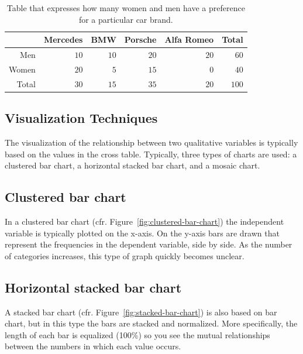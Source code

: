 \begin{table} \centering
  \begin{tabular}{@{}rrrrrr@{}}
  	\toprule
  	        & Mercedes &  BMW & Porsche & Alfa Romeo & Total  \\
  	\midrule
  	    Men &     $10$ & $10$ &    $20$ &       $20$ &   $60$ \\
  	  Women &     $20$ &  $5$ &    $15$ &        $0$ &   $40$ \\
  	  Total &     $30$ & $15$ &    $35$ &       $20$ &  $100$ \\
  	\bottomrule
  \end{tabular}
  \caption{Table that expresses how many women and men have a preference for a particular car brand.}
  \label{tab:car-preference}
\end{table}

\subsection{Visualization Techniques}
\label{ssec:qual-qual-visualization}

The visualization of the relationship between two qualitative variables is typically based on the values in the cross table. Typically, three types of charts are used: a clustered bar chart, a horizontal stacked bar chart, and a mosaic chart.

\subsection{Clustered bar chart}

In a clustered bar chart (cfr. Figure~\ref{fig:clustered-bar-chart}) the independent variable is typically plotted on the x-axis. On the y-axis bars are drawn that represent the frequencies in the dependent variable, side by side. As the number of categories increases, this type of graph quickly becomes unclear.

\subsection{Horizontal stacked bar chart}

A stacked bar chart (cfr. Figure~\ref{fig:stacked-bar-chart}) is also based on bar chart, but in this type the bars are stacked and normalized. More specifically, the length of each bar is equalized (100\%) so you see the mutual relationships between the numbers in which each value occurs.

